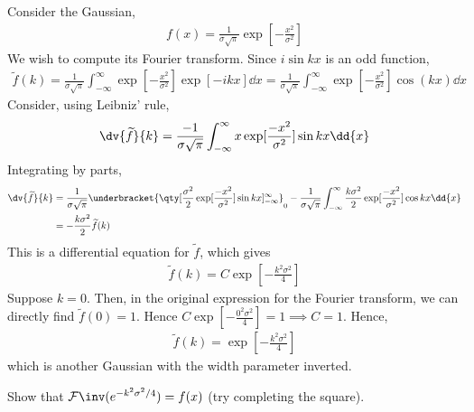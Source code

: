 \begin{example}
	Consider the Gaussian,
	\begin{align} \label{eq:8.4}
		f(x) = \frac{1}{\sigma \sqrt{\pi}} \exp[-\frac{x^2}{\sigma^2}]
	\end{align}
	We wish to compute its Fourier transform.
	Since $i \sin kx$ is an odd function,
	\begin{align*}
		\widetilde f(k) = \frac{1}{\sigma \sqrt{\pi}} \int_{-\infty}^\infty \exp[-\frac{x^2}{\sigma^2}] \exp[-ikx] \dd{x} = \frac{1}{\sigma \sqrt{\pi}} \int_{-\infty}^\infty \exp[-\frac{x^2}{\sigma^2}] \cos(kx) \dd{x}
	\end{align*}
	Consider, using Leibniz' rule,
	\begin{align*}
		\dv{\widetilde f}{k} = \frac{-1}{\sigma \sqrt{\pi}} \int_{-\infty}^\infty x\exp[\frac{-x^2}{\sigma^2}] \sin kx \dd{x}
	\end{align*}
	Integrating by parts,
	\begin{align*}
		\dv{\widetilde f}{k} & = \frac{1}{\sigma \sqrt{\pi}} \underbracket{\qty[\frac{\sigma^2}{2} \exp[\frac{-x^2}{\sigma^2}] \sin kx]_{-\infty}^\infty}_0 - \frac{1}{\sigma \sqrt{\pi}} \int_{-\infty}^\infty \frac{k\sigma^2}{2} \exp[\frac{-x^2}{\sigma^2}] \cos kx \dd{x} \\
        & = -\frac{k\sigma^2}{2} \widetilde f(k)
	\end{align*}
	This is a differential equation for $\widetilde f$, which gives
	\begin{align*}
		\widetilde f(k) = C \exp[-\frac{k^2\sigma^2}{4}]
	\end{align*}
	Suppose $k = 0$.
	Then, in the original expression for the Fourier transform, we can directly find $\widetilde f(0) = 1$.
	Hence $C \exp[-\frac{0^2\sigma^2}{4}] = 1 \implies C = 1$.
	Hence,
	\begin{align} \label{eq:8.5}
		\widetilde f(k) = \exp[-\frac{k^2\sigma^2}{4}]
	\end{align}
	which is another Gaussian with the width parameter inverted.
\end{example}

\begin{exercise}
    Show that $\mathcal{F}\inv(e^{-k^2 \sigma^2 / 4}) = f(x)$ (try completing the square).
\end{exercise}

